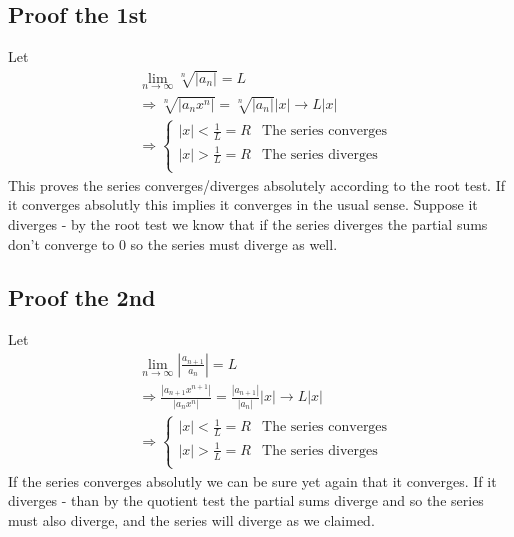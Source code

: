 \documentclass[11pt,a4paper]{article}
\theoremstyle{definition}
\theoremstyle{plain}
\begin{document}
	\subsection{Proof the 1st}
	Let
	\begin{align*}
		&\lim_{n\to\infty}{\sqrt[n]{|a_n|}} = L
		\\ &\Rightarrow
		\sqrt[n]{|a_nx^n|}=\sqrt[n]{|a_n|}|x|\to L|x|
		\\ &\Rightarrow
		\begin{cases}
		|x| < \frac{1}{L} = R & \text{The series converges} \\
		|x| > \frac{1}{L} = R & \text{The series diverges} \\
		\end{cases}
	\end{align*}
	This proves the series converges/diverges absolutely according to the root test. 
	If it converges absolutly this implies it converges in the usual sense. 
	Suppose it diverges - by the root test we know that 
	if the series diverges the partial sums don't converge to $0$ 
	so the series must diverge as well.

	\subsection{Proof the 2nd}
	Let
	\begin{align*}
		&\lim_{n\to\infty}{\left|\frac{a_{n+1}}{a_n}\right|} = L \\
		&\Rightarrow
		\frac{|a_{n+1}x^{n+1}|}{|a_nx^n|} = 
		\frac{|a_{n+1}|}{|a_n|}|x|\to L|x| \\
		&\Rightarrow
		\begin{cases}
		|x|<\frac{1}{L} = R & \text{The series converges} \\
		|x|>\frac{1}{L} = R & \text{The series diverges} \\
		\end{cases}
	\end{align*}
	If the series converges absolutly we can be sure yet again that it converges. 
	If it diverges - than by the quotient test the partial sums 
	diverge and so the series must also diverge, 
	and the series will diverge as we claimed.

	\newpage
	
\end{document}
